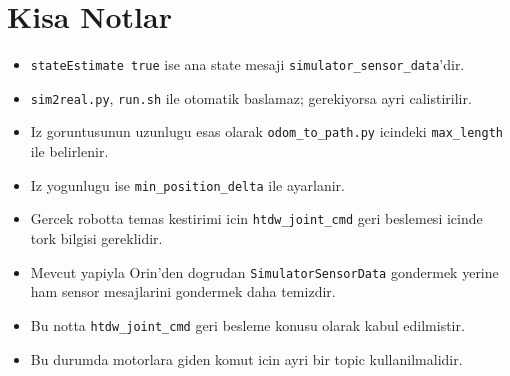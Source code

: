\documentclass[11pt]{article}
\begin{document}
\section*{Kisa Notlar}
\begin{itemize}
  \item \texttt{stateEstimate true} ise ana state mesaji \texttt{simulator\_sensor\_data}'dir.
  \item \texttt{sim2real.py}, \texttt{run.sh} ile otomatik baslamaz; gerekiyorsa ayri calistirilir.
  \item Iz goruntusunun uzunlugu esas olarak \texttt{odom\_to\_path.py} icindeki \texttt{max\_length} ile belirlenir.
  \item Iz yogunlugu ise \texttt{min\_position\_delta} ile ayarlanir.
  \item Gercek robotta temas kestirimi icin \texttt{htdw\_joint\_cmd} geri beslemesi icinde tork bilgisi gereklidir.
  \item Mevcut yapiyla Orin'den dogrudan \texttt{SimulatorSensorData} gondermek yerine ham sensor mesajlarini gondermek daha temizdir.
  \item Bu notta \texttt{htdw\_joint\_cmd} geri besleme konusu olarak kabul edilmistir.
  \item Bu durumda motorlara giden komut icin ayri bir topic kullanilmalidir.
\end{itemize}
\end{document}
